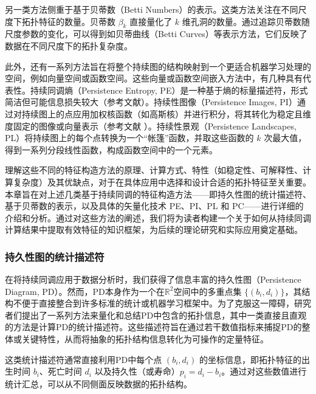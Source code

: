 另一类方法侧重于基于贝蒂数（Betti Numbers）的表示。这类方法关注在不同尺度下拓扑特征的数量。贝蒂数 $\beta_k$ 直接量化了 $k$ 维孔洞的数量。通过追踪贝蒂数随尺度参数的变化，可以得到如贝蒂曲线（Betti Curves）等表示方法，它们反映了数据在不同尺度下的拓扑复杂度。

此外，还有一系列方法旨在将整个持续图的结构映射到一个更适合机器学习处理的空间，例如向量空间或函数空间。这些向量或函数空间嵌入方法中，有几种具有代表性。持续同调熵（Persistence Entropy, PE）是一种基于熵的标量描述符，形式简洁但可能信息损失较大（参考文献\cite{atienza2020stability}）。持续性图像（Persistence Images, PI）通过对持续图上的点应用加权核函数（如高斯核）并进行积分，将其转化为稳定且维度固定的图像或向量表示（参考文献\cite{adams2017persistence} ）。持续性景观（Persistence Landscapes, PL）将持续图上的每个点转换为一个“帐篷”函数，并取这些函数的 $k$ 次最大值，得到一系列分段线性函数，构成函数空间中的一个元素。

理解这些不同的特征构造方法的原理、计算方式、特性（如稳定性、可解释性、计算复杂度）及其优缺点，对于在具体应用中选择和设计合适的拓扑特征至关重要。本章旨在对上述几类基于持续同调的特征构造方法——即持久性图的统计描述符、基于贝蒂数的表示，以及具体的矢量化技术 PE、PI、PL 和 PC——进行详细的介绍和分析。通过对这些方法的阐述，我们将为读者构建一个关于如何从持续同调计算结果中提取有效特征的知识框架，为后续的理论研究和实际应用奠定基础。

\subsubsection{持久性图的统计描述符}
\label{sec:pd_stats}
在将持续同调应用于数据分析时，我们获得了信息丰富的持久性图（Persistence Diagram, PD）。然而，PD本身作为一个在$\mathbb{R}^2$空间中的多重点集 $\{(b_i, d_i)\}$，其结构不便于直接整合到许多标准的统计或机器学习框架中。为了克服这一障碍，研究者们提出了一系列方法来量化和总结PD中包含的拓扑信息，其中一类直接且直观的方法是计算PD的统计描述符。这些描述符旨在通过若干数值指标来捕捉PD的整体或关键特性，从而将抽象的拓扑结构信息转化为可操作的定量特征。

这类统计描述符通常直接利用PD中每个点 $(b_i, d_i)$ 的坐标信息，即拓扑特征的出生时间 $b_i$、死亡时间 $d_i$ 以及持久性（或寿命）$p_i = d_i - b_i$。通过对这些数值进行统计汇总，可以从不同侧面反映数据的拓扑结构。

